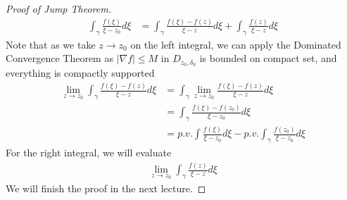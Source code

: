 \begin{proof}[Proof of Jump Theorem]
    \begin{align*}
        \int_\gamma \frac{f(\xi)}{\xi - z_0} d\xi &= \int_\gamma \frac{f(\xi) - f(z)}{\xi - z} d\xi + \int_\gamma \frac{f(z)}{\xi - z} d\xi
    \end{align*}
    Note that as we take $z \to z_0$ on the left integral, we can apply the Dominated Convergence Theorem as $|\nabla f| \leq M$ in $D_{z_0, \delta_0}$ is bounded on compact set, and everything is compactly supported
    \begin{align*}
        \lim_{z \to z_0}  \int_\gamma \frac{f(\xi) - f(z)}{\xi - z} d\xi &= \int_\gamma \lim_{z \to z_0} \frac{f(\xi) - f(z)}{\xi - z} d\xi \tag*{Dominated Convergence Theorem}\\
        &= \int_\gamma \frac{f(\xi) - f(z_0)}{\xi - z_0} d\xi\\
        &= p.v. \int \frac{f(\xi)}{\xi - z_0} d\xi - p.v. \int_\gamma \frac{f(z_0)}{\xi - z_0} d\xi \tag*{Existence of Principal Values left as Exercise}
    \end{align*}
    For the right integral, we will evaluate
    \begin{align*}
        \lim_{z \to z_0} \int_\gamma \frac{f(z)}{\xi - z} d\xi
    \end{align*}
    We will finish the proof in the next lecture.
\end{proof}